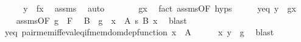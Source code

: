 \begin{isabellebody}
\ \ \isamarkupfalse%
\ \isamarkupfalse%
\ {\isachardoublequoteopen}y\ {\isacharequal}{\kern0pt}\ f{\isacharbackquote}{\kern0pt}x{\isachardoublequoteclose}\ \isamarkupfalse%
\ assms{\isacharparenleft}{\kern0pt}{}{\isacharparenright}{\kern0pt}\ \isamarkupfalse%
\ auto\isanewline
\ \ \isamarkupfalse%
\ \isamarkupfalse%
\ {\isachardoublequoteopen}{\isachardot}{\kern0pt}{\isachardot}{\kern0pt}{\isachardot}{\kern0pt}\ {\isacharequal}{\kern0pt}\ g{\isacharbackquote}{\kern0pt}x{\isachardoublequoteclose}\ \isamarkupfalse%
\ {\isacharparenleft}{\kern0pt}fact\ assms{\isacharparenleft}{\kern0pt}{}{\isacharparenright}{\kern0pt}{\isacharbrackleft}{\kern0pt}OF\ hyps{\isacharbrackright}{\kern0pt}{\isacharparenright}{\kern0pt}\isanewline
\ \ \isamarkupfalse%
\ \isamarkupfalse%
\ y{\isacharunderscore}{\kern0pt}eq{\isacharcolon}{\kern0pt}\ {\isachardoublequoteopen}y\ {\isacharequal}{\kern0pt}\ g{\isacharbackquote}{\kern0pt}x{\isachardoublequoteclose}\ \isacommand{{\isachardot}{\kern0pt}}\isamarkupfalse%
\isanewline
\ \ \isamarkupfalse%
\ assms{\isacharparenleft}{\kern0pt}{}{\isacharparenright}{\kern0pt}{\isacharbrackleft}{\kern0pt}OF\ {\isacartoucheopen}g\ {\isasymin}\ F{\isacartoucheclose}{\isacharbrackright}{\kern0pt}\ \isamarkupfalse%
\ B\ \ {\isachardoublequoteopen}g\ {\isasymin}\ {\isacharparenleft}{\kern0pt}x\ {\isasymin}\ A{\isacharparenright}{\kern0pt}\ {\isasymrightarrow}s\ {\isacharparenleft}{\kern0pt}B\ x{\isacharparenright}{\kern0pt}{\isachardoublequoteclose}\ \isamarkupfalse%
\ blast\isanewline
\ \ \isamarkupfalse%
\ y{\isacharunderscore}{\kern0pt}eq\ pair{\isacharunderscore}{\kern0pt}mem{\isacharunderscore}{\kern0pt}iff{\isacharunderscore}{\kern0pt}eval{\isacharunderscore}{\kern0pt}eq{\isacharunderscore}{\kern0pt}if{\isacharunderscore}{\kern0pt}mem{\isacharunderscore}{\kern0pt}dom{\isacharunderscore}{\kern0pt}dep{\isacharunderscore}{\kern0pt}function\ {\isacartoucheopen}x\ {\isasymin}\ A{\isacartoucheclose}\isanewline
\ \ \ \ \isamarkupfalse%
\ {\isachardoublequoteopen}{\isasymlangle}x{\isacharcomma}{\kern0pt}\ y{\isasymrangle}\ {\isasymin}\ g{\isachardoublequoteclose}\ \isamarkupfalse%
\ blast\isanewline
{}\isamarkupfalse%
%
\endisatagproof
{\isafoldproof}%
%
\isadelimproof
\isanewline
%
\endisadelimproof
\isanewline
{}\isamarkupfalse%

\end{isabellebody}
